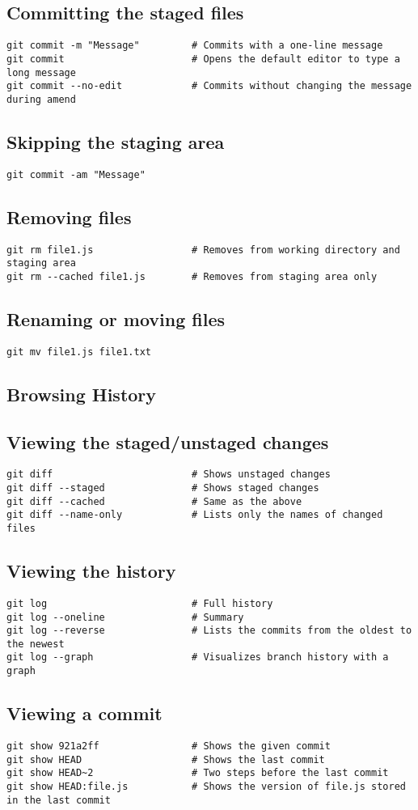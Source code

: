 \documentclass[a4paper,10pt]{article}
\newcommand{\sectiontitle}[1]{%
    \begin{center}
        \section*{#1}
    \end{center}
    \vspace{-0.5em}
}
\newcommand{\subsectiontitle}[1]{\subsection*{#1}\vspace{-0.3em}}
\begin{document}
\subsectiontitle{Committing the staged files}
\begin{verbatim}
git commit -m "Message"         # Commits with a one-line message
git commit                      # Opens the default editor to type a long message
git commit --no-edit            # Commits without changing the message during amend
\end{verbatim}

\subsectiontitle{Skipping the staging area}
\begin{verbatim}
git commit -am "Message"
\end{verbatim}

\subsectiontitle{Removing files}
\begin{verbatim}
git rm file1.js                 # Removes from working directory and staging area
git rm --cached file1.js        # Removes from staging area only
\end{verbatim}

\subsectiontitle{Renaming or moving files}
\begin{verbatim}
git mv file1.js file1.txt
\end{verbatim}
\newpage

\sectiontitle{Browsing History}
\subsectiontitle{Viewing the staged/unstaged changes}
\begin{verbatim}
git diff                        # Shows unstaged changes
git diff --staged               # Shows staged changes
git diff --cached               # Same as the above
git diff --name-only            # Lists only the names of changed files
\end{verbatim}

\subsectiontitle{Viewing the history}
\begin{verbatim}
git log                         # Full history
git log --oneline               # Summary
git log --reverse               # Lists the commits from the oldest to the newest
git log --graph                 # Visualizes branch history with a graph
\end{verbatim}

\subsectiontitle{Viewing a commit}
\begin{verbatim}
git show 921a2ff                # Shows the given commit
git show HEAD                   # Shows the last commit
git show HEAD~2                 # Two steps before the last commit
git show HEAD:file.js           # Shows the version of file.js stored in the last commit
\end{verbatim}
\end{document}
